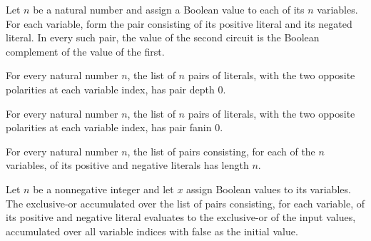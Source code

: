 \begin{theorem}
\label{BoolCircuit.isDual_parityPairs}
\leanok
{}
Let $n$ be a natural number and assign a Boolean value to each of its $n$ variables. For
each variable, form the pair consisting of its positive literal and its negated literal.
In every such pair, the value of the second circuit is the Boolean complement of the
value of the first.
\end{theorem}

\begin{theorem}
\label{BoolCircuit.pairDepth_parityPairs}
\leanok
{}
For every natural number $n$, the list of $n$ pairs of literals, with the two opposite
polarities at each variable index, has pair depth $0$.
\end{theorem}

\begin{theorem}
\label{BoolCircuit.pairFanin_parityPairs}
\leanok
{}
For every natural number $n$, the list of $n$ pairs of literals, with the two opposite
polarities at each variable index, has pair fanin $0$.
\end{theorem}

\begin{theorem}
\label{BoolCircuit.length_parityPairs}
\leanok
{}
For every natural number $n$, the list of pairs consisting, for each of the $n$
variables, of its positive and negative literals has length $n$.
\end{theorem}

\begin{theorem}
\label{BoolCircuit.xorAll_parityPairs}
\leanok
{}
Let $n$ be a nonnegative integer and let $x$ assign Boolean values to its variables. The
exclusive-or accumulated over the list of pairs consisting, for each variable, of its
positive and negative literal evaluates to the exclusive-or of the input values,
accumulated over all variable indices with false as the initial value.
\end{theorem}

